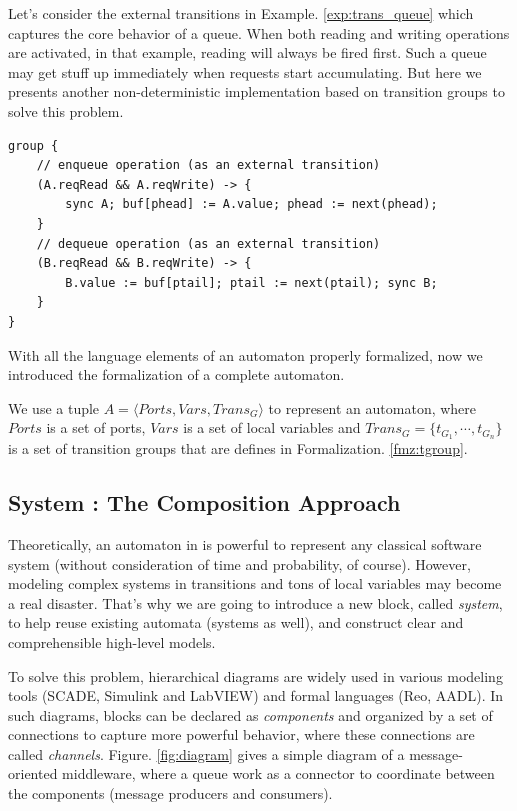 \begin{example} Let's consider the external transitions in Example. \ref{exp:trans_queue} which captures the core behavior of a queue. When both reading and writing operations are activated, in that example, reading will always be fired first. Such a queue may get stuff up immediately when requests start accumulating. But here we presents another non-deterministic implementation based on transition groups to solve this problem.
\begin{lstlisting}
group {
    // enqueue operation (as an external transition)
    (A.reqRead && A.reqWrite) -> {
        sync A; buf[phead] := A.value; phead := next(phead);
    }
    // dequeue operation (as an external transition)
    (B.reqRead && B.reqWrite) -> {
        B.value := buf[ptail]; ptail := next(ptail); sync B;
    }
}
\end{lstlisting}
\label{exp:transgroup_queue}
\end{example}

With all the language elements of an automaton properly formalized, now we introduced the formalization of a complete automaton.

\begin{formalization}[Automata]
    We use a tuple $A=\langle Ports, Vars, Trans_G \rangle$ to represent an automaton, where $Ports$ is a set of ports, $Vars$ is a set of local variables and $Trans_G=\{t_{G_1},\cdots,t_{G_n}\}$ is a set of transition groups that are defines in Formalization. \ref{fmz:tgroup}.
\end{formalization}

\subsection{System : The Composition Approach}
\label{subsec:system}

Theoretically, an automaton in \lang{} is powerful to represent any classical software system (without consideration of time and probability, of course). However, modeling complex systems in transitions and tons of local variables may become a real disaster. That's why we are going to introduce a new block, called \emph{system}, to help reuse existing automata (systems as well), and construct clear and comprehensible high-level models.

To solve this problem, hierarchical diagrams are widely used in various modeling tools (SCADE\cite{AbdullaISoLA2006,BerryScp1992}, Simulink and LabVIEW) and formal languages (Reo\cite{ArbabMscsReo2004}, AADL). In such diagrams, blocks can be declared as \emph{components} and organized by a set of connections to capture more powerful behavior, where these connections are called \emph{channels}. Figure. \ref{fig:diagram} gives a simple diagram of a message-oriented middleware, where a queue work as a connector to coordinate between the components (message producers and consumers).

